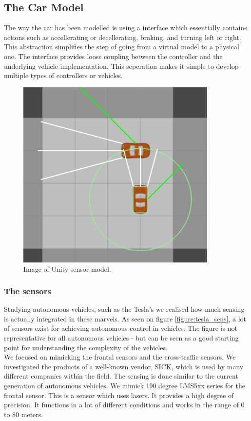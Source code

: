 \subsection{The Car Model}
The way the car has been modelled is using a interface which essentially contains actions such as accellerating or decellerating, braking, and turning left or right.
This abstraction simplifies the step of going from a virtual model to a physical one.
The interface provides loose coupling between the controller and the underlying vehicle implementation.
This seperation makes it simple to develop multiple types of controllers or vehicles.

\begin{figure}
\centering
\includegraphics[scale=.5]{img/sensors}
\caption{Image of Unity sensor model.}
\label{figure:unity_sens}
\end{figure}

\subsubsection{The sensors}
Studying autonomous vehicles, such as the Tesla's we realised how much sensing is actually integrated in these marvels.
As seen on figure \ref{figure:tesla_sens}, a lot of sensors exist for achieving autonomous control in vehicles.
The figure is not representative for all autonomous vehicles - but can be seen as a good starting point for understanding the complexity of the vehicles.\\

We focused on mimicking the frontal sensors and the cross-traffic sensors.
We investigated the products of a well-known vendor, SICK, which is used by many different companies within the field.
The sensing is done similar to the current generation of autonomous vehicles. We mimick 190 degree LMS5xx series for the frontal sensor. This is a sensor which uses lasers. It provides a high degree of precision. It functions in a lot of different conditions and works in the range of 0 to 80 meters.

